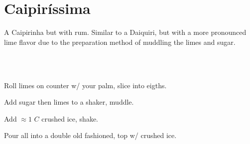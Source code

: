 \section[Caipir\'issima]{Caipir\'issima~}


\begin{recipestats}[
	servings=1,
	preptime=5 \minute,
	source=Mike \& Jane,
	original=\citefield{diffordsCaipirissima}{author} \cite{diffordsCaipirissima},
]
\end{recipestats}

\begin{recipeabstract}
	A Caipirinha but with rum.
	Similar to a Daiquiri, but with a more pronounced lime flavor due to the preparation method of muddling the limes and sugar.
\end{recipeabstract}


\begin{ingredientcolumns}[1]
	\begin{ingredientblock}
		\\
		\\
	\end{ingredientblock}
\end{ingredientcolumns}


\begin{preparation}
\item Roll limes on counter w/ your palm, slice into eigths.
\item Add sugar then limes to a shaker, muddle.
\item Add $\approx 1$ $C$ crushed ice, shake.
\item Pour all into a double old fashioned, top w/ crushed ice.
\end{preparation}


\recipeend%
